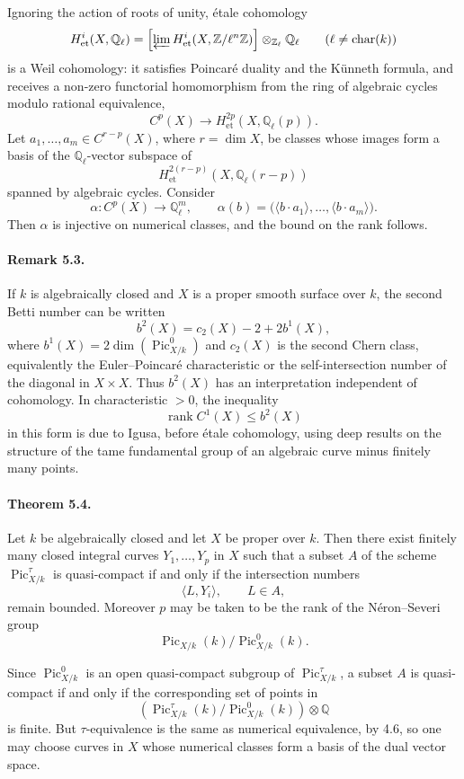 \documentclass[12pt]{article}
\newcommand{\ZZ}{\mathbb Z}
\newcommand{\QQ}{\mathbb Q}
\newcommand{\Pic}{\operatorname{Pic}}
\newcommand{\rank}{\operatorname{rank}}
\newcommand{\car}{\operatorname{char}}
\newcommand{\longto}{\longrightarrow}
\begin{document}
Ignoring the action of roots of unity, étale cohomology
\[
H^i_{\mathrm{et}}(X,\QQ_\ell)=
\left[\varprojlim H^i_{\mathrm{et}}(X,\ZZ/\ell^n\ZZ)\right]\otimes_{\ZZ_\ell}\QQ_\ell
\qquad (\ell\neq\car(k))
\]
is a Weil cohomology: it satisfies Poincaré duality and the Künneth formula, and receives a non-zero functorial homomorphism from the ring of algebraic cycles modulo rational equivalence,
\[
C^p(X)\longto H^{2p}_{\mathrm{et}}(X,\QQ_\ell(p)).
\]
Let $a_1,\ldots,a_m\in C^{r-p}(X)$, where $r=\dim X$, be classes whose images form a basis of the $\QQ_\ell$-vector subspace of
\[
H^{2(r-p)}_{\mathrm{et}}(X,\QQ_\ell(r-p))
\]
spanned by algebraic cycles. Consider
\[
\alpha:C^p(X)\longto \QQ_\ell^m,\qquad
\alpha(b)=\bigl(\langle b\cdot a_1\rangle,\ldots,\langle b\cdot a_m\rangle\bigr).
\]
Then $\alpha$ is injective on numerical classes, and the bound on the rank follows.

\paragraph{Remark 5.3.}
If $k$ is algebraically closed and $X$ is a proper smooth surface over $k$, the second Betti number can be written
\[
b^2(X)=c_2(X)-2+2b^1(X),
\]
where $b^1(X)=2\dim(\Pic^0_{X/k})$ and $c_2(X)$ is the second Chern class, equivalently the Euler--Poincaré characteristic or the self-intersection number of the diagonal in $X\times X$. Thus $b^2(X)$ has an interpretation independent of cohomology. In characteristic $>0$, the inequality
\[
\rank C^1(X)\leq b^2(X)
\]
in this form is due to Igusa, before étale cohomology, using deep results on the structure of the tame fundamental group of an algebraic curve minus finitely many points.

\paragraph{Theorem 5.4.}
Let $k$ be algebraically closed and let $X$ be proper over $k$. Then there exist finitely many closed integral curves $Y_1,\ldots,Y_p$ in $X$ such that a subset $A$ of the scheme $\Pic^\tau_{X/k}$ is quasi-compact if and only if the intersection numbers
\[
\langle L,Y_i\rangle,\qquad L\in A,
\]
remain bounded. Moreover $p$ may be taken to be the rank of the Néron--Severi group
\[
\Pic_{X/k}(k)/\Pic^0_{X/k}(k).
\]

Since $\Pic^0_{X/k}$ is an open quasi-compact subgroup of $\Pic^\tau_{X/k}$, a subset $A$ is quasi-compact if and only if the corresponding set of points in
\[
\left(\Pic^\tau_{X/k}(k)/\Pic^0_{X/k}(k)\right)\otimes\QQ
\]
is finite. But $\tau$-equivalence is the same as numerical equivalence, by 4.6, so one may choose curves in $X$ whose numerical classes form a basis of the dual vector space.
\end{document}
